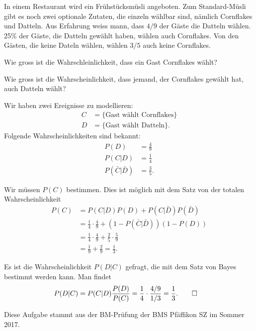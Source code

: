 In einem Restaurant wird ein Frühstücksmüsli angeboten.
Zum Standard-Müsli gibt es noch zwei optionale Zutaten, die einzeln
wählbar sind, nämlich Cornflakes und Datteln.
Aus Erfahrung weiss mann, dass $4/9$ der Gäste die
Datteln wählen.
25\% der Gäste, die Datteln gewählt haben, wählen auch Cornflakes.
Von den Gästen, die keine Dateln wählen, wählen $3/5$ auch keine Cornflakes.

\begin{teilaufgaben}
\item Wie gross ist die Wahrschleinlichkeit, dass ein Gast Cornflakes wählt?
\item Wie gross ist die Wahrscheinlichkeit, dass jemand, der Cornflakes
gewählt hat, auch Datteln wählt?
\end{teilaufgaben}

\begin{loesung}
Wir haben zwei Ereignisse zu modellieren:
\begin{align*}
C
&=
\{\text{Gast wählt Cornflakes}\}
\\
D
&=
\{\text{Gast wählt Datteln}\}.
\end{align*}
Folgende Wahrscheinlichkeiten sind bekannt:
\begin{align*}
P(D)
&=
\frac49
\\
P(C|D)
&=
\frac14
\\
P(\bar C|\bar D)
&=
\frac35.
\end{align*}
\begin{teilaufgaben}
\item Wir müssen $P(C)$ bestimmen.
Dies ist möglich mit dem Satz von der totalen Wahrscheinlichkeit
\begin{align*}
P(C)
&=
P(C|D)P(D) + P(C|\bar D)P(\bar D)
\\
&=
\frac14\cdot \frac49 + (1-P(\bar C|\bar D))(1-P(D))
\\
&=
\frac14\cdot \frac49 + \frac25 \cdot\frac59
\\
&=
\frac19 +\frac29=\frac13.
\end{align*}
\item
Es ist die Wahrscheinlichkeit $P(D|C)$ gefragt, die mit dem Satz von Bayes
bestimmt werden kann.
Man findet
\begin{align*}
P(D|C)
&=
P(C|D)\frac{P(D)}{P(C)}
=
\frac14\cdot\frac{4/9}{1/3}=\frac13.
\qedhere
\end{align*}
\end{teilaufgaben}
\end{loesung}

\begin{diskussion}
Diese Aufgabe stammt aus der BM-Prüfung der BMS Pfäffikon SZ im Sommer 2017.
\end{diskussion}

